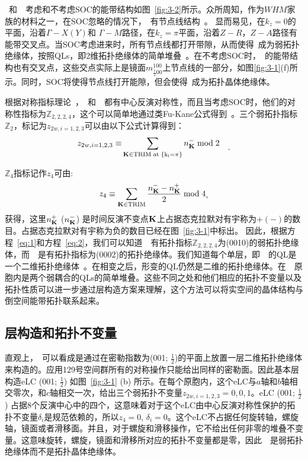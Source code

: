 \ti~和~\tci~考虑和不考虑SOC的能带结构如图~\ref{fig:3-2}所示。众所周知，作为$WHM$家族的材料之一，在SOC忽略的情况下，\ti~有节点线结构~\citep{xu2015two, lou2016emergence}。 显而易见，在$k_z=0$的平面，沿着$\Gamma-X (Y)$和 $\Gamma-M$路径，在$k_z=\pi$平面，沿着$Z-R$，$Z-A$路径有能带交叉点。当SOC考虑进来时，所有节点线都打开带隙，从而使得\ti~成为弱拓扑绝缘体，按照QLs，即2维拓扑绝缘体的简单堆叠~\citep{xu2015two}。在不考虑SOC时，\tci~的能带结构也有交叉点，这些交点实际上是镜面$m^{100}_{\frac{1}{2}00 }$上节点线的一部分，如图\ref{fig:3-1}(f)所示。同时，SOC将使得节点线打开能隙，但会使得\tci~成为拓扑晶体绝缘体。


根据对称指标理论~\citep{nc_ashvin,wanxg2019}，\ti~和~\tci~都有中心反演对称性，而且当考虑SOC时，他们的对称性指标为$\mathbb Z_{2,2,2,4}$，这个可以简单地通过类Fu-Kane公式得到~\citep{song2017, prx_ashvin}。三个弱拓扑指标$\mathbb Z_2$，标记为$z_{2w,i=1,2,3}$可以由以下公式计算得到：
\begin{equation}
\label{eq:1}
\begin{aligned}
z_{2w,i=1,2,3}\equiv&\sum_{\rm {\bold K}\in TRIM \;at \;\{k_i=\pi\}} n^{-}_{\bold K} \; \mathrm {mod} \;{2}
\end{aligned} .
\end{equation}

$\mathbb Z_4$指标记作$z_4$可由:
\begin{equation}
\label{eq:2}
\begin{aligned}
 z_4  \equiv \sum_{\rm \bold K \in TRIM} \frac {n^{-}_{\bold K} -n^{+}_{\bold K}}{2}  \; \mathrm {mod} \;{4}
 \end{aligned} ,
\end{equation}
获得，这里$n^{+}_{\bold K}$ ($n^{-}_{\bold K}$) 是时间反演不变点$\bold K$上占据态克拉默对有宇称为$+(-)$的数目。占据态克拉默对有宇称为负的数目已经在图~\ref{fig:3-1}中标出。 因此，根据方程~\ref{eq:1}和方程~\ref{eq:2}，我们可以知道~\ti~有拓扑指标$\mathbb Z_{2,2,2,4}$为(0010)的弱拓扑绝缘体，而~\tci~是有拓扑指标为(0002)的拓扑绝缘体。我们知道每个单层，即~\ti~的QL是一个二维拓扑绝缘体~\citep{xu2015two}。在相变之后，形变的QL仍然是二维的拓扑绝缘体。在~\tci~原胞内是两个弱耦合的QLs的简单堆叠。这些不同之处和他们相应的拓扑不变量以及拓扑性质可以进一步通过层构造方案来理解，这个方法可以将实空间的晶体结构与倒空间能带拓扑联系起来。

\subsection{层构造和拓扑不变量}
直观上，\ti~可以看成是通过在密勒指数为(001; $\frac{1}{2}$)的平面上放置一层二维拓扑绝缘体来构造的。应用129号空间群所有的对称操作只能给出同样的密勒面。因此基本层构造eLC (001; $\frac{1}{2}$) 如图~\ref{fig:3-1} (b) 所示。在每个原胞内，这个eLC与$a$轴和$b$轴相交零次，和$c$轴相交一次，给出三个弱拓扑不变量$z_{2w, i=1, 2, 3}=0,0,1$。eLC (001; $\frac{1}{2}$) 占据8个反演中心中的四个，这意味着对于这个eLC由中心反演对称性保护的拓扑不变量$\delta_i$是规范依赖的，所以$z_4=0$, $\delta_i=0$。这个eLC不占据任何旋转轴，螺旋轴，镜面或者滑移面。并且，对于螺旋和滑移操作，它不给出任何非零的堆叠不变量。这意味旋转，螺旋，镜面和滑移所对应的拓扑不变量都是零，因此~\ti~是弱拓扑绝缘体而不是拓扑晶体绝缘体。


